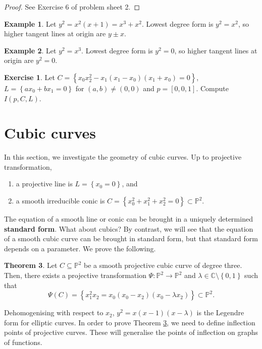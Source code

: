 \documentclass{article}
\newcommand{\C}{\mathbb{C}}
\renewcommand{\P}{\mathbb{P}}
\newcommand{\rb}[1]{\left( #1 \right)}
\renewcommand{\sb}[1]{\left[ #1 \right]}
\newcommand{\cb}[1]{\left\{ #1 \right\}}
\theoremstyle{definition}\newtheorem{definition}{Definition}[section]
\theoremstyle{definition}\newtheorem{notation}[definition]{Notation}
\theoremstyle{definition}\newtheorem{remark}[definition]{Remark}
\theoremstyle{definition}\newtheorem{example}[definition]{Example}
\theoremstyle{definition}\newtheorem{fact}{Fact}
\theoremstyle{definition}\newtheorem{exercise}{Exercise}
\newtheorem{theorem}[definition]{Theorem}
\begin{document}
\begin{proof}
See Exercise 6 of problem sheet 2.
\end{proof}

\begin{example}
Let $ y^2 = x^2\rb{x + 1} = x^3 + x^2 $. Lowest degree form is $ y^2 = x^2 $, so higher tangent lines at origin are $ y \pm x $.
\end{example}

\begin{example}
Let $ y^2 = x^3 $. Lowest degree form is $ y^2 = 0 $, so higher tangent lines at origin are $ y^2 = 0 $.
\end{example}

\begin{exercise}
Let $ C = \cb{x_0x_2^2 - x_1\rb{x_1 - x_0}\rb{x_1 + x_0} = 0} $, $ L = \cb{ax_0 + bx_1 = 0} $ for $ \rb{a, b} \ne \rb{0, 0} $ and $ p = \sb{0, 0, 1} $. Compute $ I\rb{p, C, L} $.
\end{exercise}

\section{Cubic curves}

In this section, we investigate the geometry of cubic curves. Up to projective transformation,
\begin{enumerate}
\item a projective line is $ L = \cb{x_0 = 0} $, and
\item a smooth irreducible conic is $ C = \cb{x_0^2 + x_1^2 + x_2^2 = 0} \subset \P^2 $.
\end{enumerate}
The equation of a smooth line or conic can be brought in a uniquely determined \textbf{standard form}. What about cubics? By contrast, we will see that the equation of a smooth cubic curve can be brought in standard form, but that standard form depends on a parameter. We prove the following.

\begin{theorem}
\label{thm:13.1}
Let $ C \subseteq \P^2 $ be a smooth projective cubic curve of degree three. Then, there exists a projective transformation $ \Psi : \P^2 \to \P^2 $ and $ \lambda \in \C \setminus \cb{0, 1} $ such that
$$ \Psi\rb{C} = \cb{x_1^2x_2 = x_0\rb{x_0 - x_2}\rb{x_0 - \lambda x_2}} \subset \P^2. $$
\end{theorem}

Dehomogenising with respect to $ x_2 $, $ y^2 = x\rb{x - 1}\rb{x - \lambda} $ is the Legendre form for elliptic curves. In order to prove Theorem \ref{thm:13.1}, we need to define inflection points of projective curves. These will generalise the points of inflection on graphs of functions.
\end{document}
